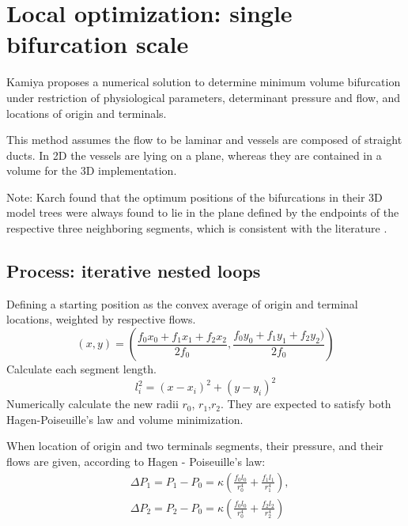 \documentclass[a4paper, 11pt]{article} %
\begin{document}



\section{Local optimization: single bifurcation scale}\label{Kamiya}
Kamiya proposes a numerical solution to determine minimum volume bifurcation under restriction of physiological parameters, determinant pressure and flow, and locations of origin and terminals.

This method assumes the flow to be laminar and vessels are composed of straight ducts. In 2D the vessels are lying on a plane, whereas they are contained in a volume for the 3D implementation. 

Note: Karch found that the optimum positions of the bifurcations in their 3D model trees were always found to lie in the plane defined by the endpoints of the respective three neighboring segments, which is consistent with the literature \cite{zamir1986branching}. 


\subsection*{Process: iterative nested loops}

Defining a starting position as the convex average of origin and terminal locations, weighted by respective flows.
\begin{equation}
(x,y) = (\frac{f_0x_0 + f_1x_1 + f_2x_2}{2f_0},\frac{f_0y_0 + f_1y_1 + f_2y_2 )}{2f_0})
\end{equation}
Calculate each segment length.
\begin{equation}
l_i^2 = (x - x_i)^2 + (y - y_i)^2
\label{length}
\end{equation}
Numerically calculate the new radii $r_0$, $r_1$,$r_2$. They are expected to satisfy both Hagen-Poiseuille's law and volume minimization.

When location of origin and two terminals segments, their pressure, and their flows are given, according to Hagen - Poiseuille's law:
\begin{align}
&\Delta P_1 = P_1 - P_0 = \kappa(\frac{f_0l_0}{r_0^4} + \frac{f_1l_1}{r_1^4}), \\
&\Delta P_2 = P_2 - P_0 = \kappa(\frac{f_0l_0}{r_0^4} + \frac{f_2l_2}{r_2^4})
\label{poiseuille}
\end{align}
  
\end{document}
